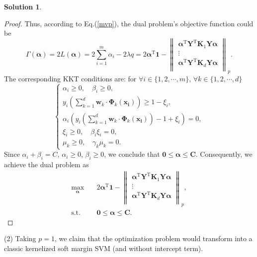 \documentclass[a4paper,UTF8]{article}
\numberwithin{equation}{section}
\theoremstyle{definition}
\newtheorem*{solution}{Solution}
\begin{document}
\begin{solution}
\begin{proof}
Thus, according to Eq.(\ref{mvp}), the dual problem's objective function could be
\begin{equation}
\Gamma(\bm\alpha)=2L(\bm{\alpha})=2\sum_{i=1}^m\alpha_i-2\lambda q=2\bm\alpha^\mathrm T \bm{1}- \left\lVert
\begin{matrix}
   \bm\alpha^\mathrm{T}\bm{Y}^\mathrm{T} \bm{K}_1 \bm{Y}\bm\alpha \\
   \vdots \\
   \bm\alpha^\mathrm{T}\bm{Y}^\mathrm{T} \bm{K}_d \bm{Y}\bm\alpha \\
  \end{matrix}\right\rVert_p.
\end{equation}
The corresponding KKT conditions are:  for $\forall i \in\{1,2,\cdots, m\}$, $\forall k \in\{1,2,\cdots, d\}$
\begin{equation}
\left\{
\begin{array}{l}
\alpha_i\geq 0, \quad \beta_i\geq 0,\\
y_i(\sum_{k=1}^d\bm{w}_k\cdot\bm{\Phi}_k(\bm{x_i}))\geq 1-\xi_i,\\
\alpha_i(y_i(\sum_{k=1}^d\bm{w}_k\cdot\bm{\Phi}_k(\bm{x_i}))-1+\xi_i)=0,\\
\xi_i\geq 0, \quad \beta_i\xi_i=0,\\
\mu_k\geq 0, \quad \gamma_k\mu_k=0.
\end{array}
\right.
\end{equation}
Since $\alpha_i+\beta_i=C$, $\alpha_i\geq 0$, $\beta_i\geq 0$, we conclude that $\bm{0}\leq\bm\alpha\leq\bm{C}$. Consequently, we achieve the dual problem as
\begin{equation}
\begin{split}
\max_{\bm{\alpha}} &\quad 2\bm\alpha^\mathrm T \bm{1}- \left\lVert
\begin{matrix}
   \bm\alpha^\mathrm{T}\bm{Y}^\mathrm{T} \bm{K}_1 \bm{Y}\bm\alpha \\
   \vdots \\
   \bm\alpha^\mathrm{T}\bm{Y}^\mathrm{T} \bm{K}_d \bm{Y}\bm\alpha \\
  \end{matrix}\right\rVert_p,\\
\text{s.t.} &\quad \bm{0}\leq\bm\alpha\leq\bm{C}.
\end{split}
\end{equation}
\end{proof}

\item[(2)] Taking $p=1$, we claim that the optimization problem would transform into a classic kernelized soft margin SVM (and without intercept term). 


\end{solution}
\end{document}
